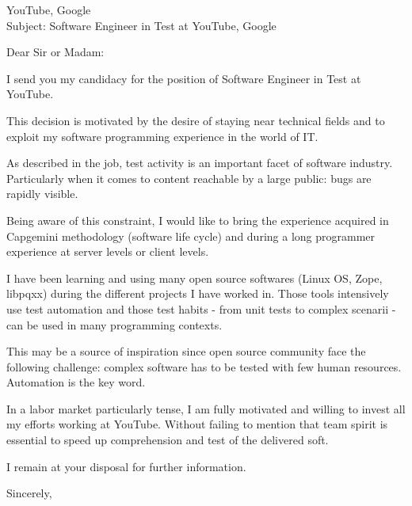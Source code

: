 \documentclass[a4paper,11pt]{letter}
\begin{document}
\begin{letter}{YouTube, Google\\ \bigskip Subject: Software Engineer in Test at YouTube, Google}
\opening{Dear Sir or Madam:}

I send you my candidacy for the position of Software Engineer in Test at YouTube.

This decision is motivated by the desire of staying near technical fields and to exploit my software programming experience in the world of IT.

As described in the job, test activity is an important facet of software industry. Particularly when it comes to content reachable by a large public: bugs are rapidly visible.

Being aware of this constraint, I would like to bring the experience acquired in Capgemini methodology (software life cycle) and during a long programmer experience at server levels or client levels.

I have been learning and using many open source softwares (Linux OS, Zope, libpqxx) during the different projects I have worked in. Those tools intensively use test automation and those test habits - from unit tests to complex scenarii - can be used in many programming contexts.

This may be a source of inspiration since open source community face the following challenge: complex software has to be tested with few human resources. Automation is the key word.

In a labor market particularly tense, I am fully motivated and willing to invest all my efforts working at YouTube. Without failing to mention that team spirit is essential to speed up comprehension and test of the delivered soft.

I remain at your disposal for further information.

\closing{Sincerely,}

\end{letter}
\end{document}
